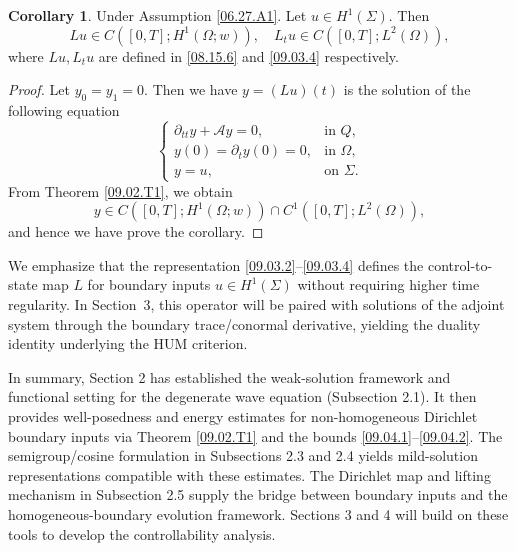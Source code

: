 \documentclass[preprint,12pt]{elsarticle}
\theoremstyle{definition}   %
\newtheorem{corollary}[theorem]{Corollary}
\numberwithin{equation}{section}
\def\pt{\partial}
\def\pt{\partial}
\def\Om{\Omega}
\def\mcA{\mathcal{A}}
\begin{document}
 




\begin{corollary}\label{09.03.C1}
	Under Assumption \ref{06.27.A1}. Let $u\in H^{1}(\Sigma)$. Then  
	\begin{equation*}
		Lu\in C([0,T]; H^1(\Om;w)),\quad L_tu\in C([0,T]; L^2(\Om)), 
	\end{equation*}
	where $Lu, L_tu$ are defined in \eqref{08.15.6} and \eqref{09.03.4} respectively. 
\end{corollary}

\begin{proof}
	Let $y_0=y_1=0$. Then we have $y=(Lu)(t)$ is the solution of the following equation
	\begin{equation*}
		\begin{cases}
			\pt_{tt}y+\mcA y=0, &\mbox{in }Q, \\
			y(0)=\pt_ty(0)=0, &\mbox{in }\Om,\\
			y=u, &\mbox{on }\Sigma. 
		\end{cases}
	\end{equation*}
	From Theorem \ref{09.02.T1}, we obtain 
	\begin{equation*}
		y\in C([0,T]; H^1(\Om;w))\cap C^1([0,T]; L^2(\Om)), 
	\end{equation*}
	and hence we have prove the corollary. 
\end{proof}

We emphasize that the representation \eqref{09.03.2}--\eqref{09.03.4} defines the control-to-state map $L$ for boundary inputs $u\in H^1(\Sigma)$ without requiring higher time regularity. In Section~3, this operator will be paired with solutions of the adjoint system through the boundary trace/conormal derivative, yielding the duality identity underlying the HUM criterion.







In summary, Section 2 has established the weak-solution framework and functional setting for the degenerate wave equation (Subsection 2.1). It then provides well-posedness and energy estimates for non-homogeneous Dirichlet boundary inputs via Theorem \ref{09.02.T1} and the bounds \eqref{09.04.1}--\eqref{09.04.2}. The semigroup/cosine formulation in Subsections 2.3 and 2.4 yields mild-solution representations compatible with these estimates. The Dirichlet map and lifting mechanism in Subsection 2.5 supply the bridge between boundary inputs and the homogeneous-boundary evolution framework. Sections 3 and 4 will build on these tools to develop the controllability analysis.
\end{document}
